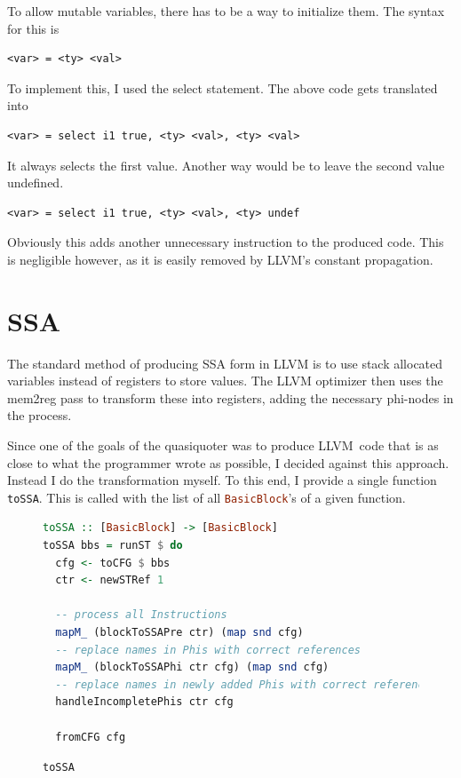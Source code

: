 \documentclass[a4paper,bibliography=totocnumbered,parskip,headsepline]{scrbook}
\begin{document}
To allow mutable variables, there has to be a way to initialize them.
The syntax for this is
\begin{lstlisting}[numbers=none]
 <var> = <ty> <val>
\end{lstlisting}
To implement this, I used the select statement.
The above code gets translated into
\begin{lstlisting}[numbers=none]
 <var> = select i1 true, <ty> <val>, <ty> <val>
\end{lstlisting}
It always selects the first value.
Another way would be to leave the second value undefined.
\begin{lstlisting}[numbers=none]
 <var> = select i1 true, <ty> <val>, <ty> undef
\end{lstlisting}
Obviously this adds another unnecessary instruction to the produced code.
This is negligible however, as it is easily removed by LLVM's constant propagation.

\section{SSA}
\label{sec:ssa}
The standard method of producing SSA form in LLVM is to use stack allocated variables instead of registers to store values.
The LLVM optimizer then uses the mem2reg pass to transform these into registers, adding the necessary phi-nodes in the process.

Since one of the goals of the quasiquoter was to produce LLVM~code that is as close to what the programmer wrote as possible, I decided against this approach.
Instead I do the transformation myself.
To this end, I provide a single function \lstinline[language=haskell]!toSSA!.
This is called with the list of all \lstinline[language=haskell]!BasicBlock!'s of a given function.

\begin{figure}
\begin{lstlisting}[language=haskell]
toSSA :: [BasicBlock] -> [BasicBlock]
toSSA bbs = runST $ do
  cfg <- toCFG $ bbs
  ctr <- newSTRef 1

  -- process all Instructions
  mapM_ (blockToSSAPre ctr) (map snd cfg)
  -- replace names in Phis with correct references
  mapM_ (blockToSSAPhi ctr cfg) (map snd cfg)
  -- replace names in newly added Phis with correct references
  handleIncompletePhis ctr cfg

  fromCFG cfg
\end{lstlisting}
\caption{\lstinline[language=haskell]!toSSA!}
\label{fig:tossa}
\end{figure}
\end{document}
